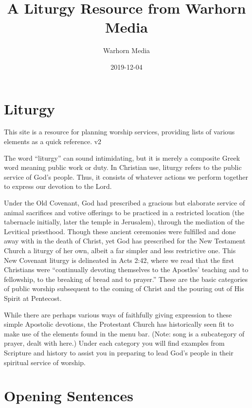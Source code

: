 \documentclass[]{book}
\title{A Liturgy Resource from Warhorn Media}
\author{Warhorn Media}
\date{2019-12-04}
\begin{document}
\maketitle

{
\setcounter{tocdepth}{1}
\tableofcontents
}
\hypertarget{liturgy}{%
\chapter*{Liturgy}\label{liturgy}}

This site is a resource for planning worship services, providing lists of various elements as a quick reference. v2

The word ``liturgy'' can sound intimidating, but it is merely a composite Greek word meaning public work or duty. In Christian use, liturgy refers to the public service of God's people. Thus, it consists of whatever actions we perform together to express our devotion to the Lord.

Under the Old Covenant, God had prescribed a gracious but elaborate service of animal sacrifices and votive offerings to be practiced in a restricted location (the tabernacle initially, later the temple in Jerusalem), through the mediation of the Levitical priesthood. Though these ancient ceremonies were fulfilled and done away with in the death of Christ, yet God has prescribed for the New Testament Church a liturgy of her own, albeit a far simpler and less restrictive one. This New Covenant liturgy is delineated in Acts 2:42, where we read that the first Christians were ``continually devoting themselves to the Apostles' teaching and to fellowship, to the breaking of bread and to prayer.'' These are the basic categories of public worship subsequent to the coming of Christ and the pouring out of His Spirit at Pentecost.

While there are perhaps various ways of faithfully giving expression to these simple Apostolic devotions, the Protestant Church has historically seen fit to make use of the elements found in the menu bar. (Note: song is a subcategory of prayer, dealt with here.) Under each category you will find examples from Scripture and history to assist you in preparing to lead God's people in their spiritual service of worship.

\hypertarget{opening-sentences}{%
\chapter*{Opening Sentences}\label{opening-sentences}}
\end{document}
